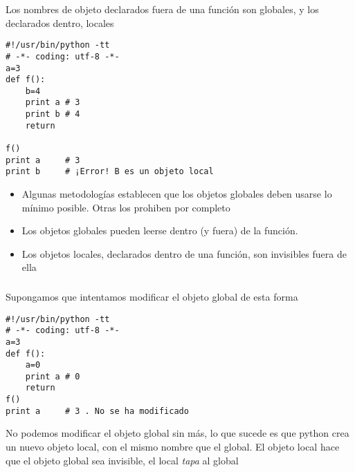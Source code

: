 \documentclass[ucs]{beamer}
\begin{document}

\begin{frame}[fragile]
Los nombres de objeto declarados fuera de una función son globales,
y los declarados dentro, locales
  \begin{scriptsize}
\begin{verbatim}
#!/usr/bin/python -tt
# -*- coding: utf-8 -*-
a=3
def f():
    b=4
    print a # 3
    print b # 4
    return 

f()
print a     # 3
print b     # ¡Error! B es un objeto local
\end{verbatim}
  \end{scriptsize}


\begin{itemize}
\item
Algunas metodologías establecen que los objetos globales deben usarse
lo mínimo posible. Otras los prohiben por completo

\item
Los objetos globales pueden leerse dentro (y fuera) de la función.

\item
Los objetos locales, declarados dentro de una función,
son invisibles fuera de ella
\end{itemize}


\end{frame}

\begin{frame}[fragile]
\frametitle{}
Supongamos que intentamos modificar el objeto global de esta forma

  \begin{footnotesize}
  \begin{verbatim}
#!/usr/bin/python -tt
# -*- coding: utf-8 -*-
a=3
def f():
    a=0
    print a # 0
    return 
f()
print a     # 3 . No se ha modificado
  \end{verbatim}
  \end{footnotesize}
No podemos modificar el objeto global sin más, lo que sucede es que
python crea un nuevo objeto local, con el mismo nombre que el global.
El objeto local hace que el objeto global sea invisible, 
el local \emph{tapa} al global
\end{frame}
\end{document}
